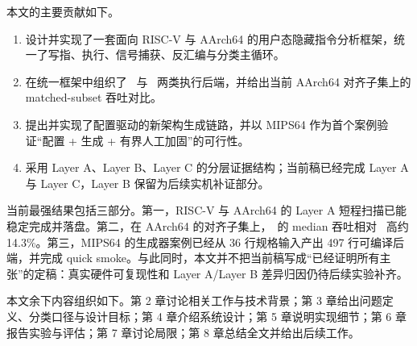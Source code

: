 本文的主要贡献如下。
\begin{enumerate}[leftmargin=2em]
  \item 设计并实现了一套面向 RISC-V 与 AArch64 的用户态隐藏指令分析框架，统一了写指、执行、信号捕获、反汇编与分类主循环。
  \item 在统一框架中组织了 \memcage\ 与 \ptracebackend\ 两类执行后端，并给出当前 AArch64 对齐子集上的 matched-subset 吞吐对比。
  \item 提出并实现了配置驱动的新架构生成链路，并以 MIPS64 作为首个案例验证“配置 + 生成 + 有界人工加固”的可行性。
  \item 采用 Layer A、Layer B、Layer C 的分层证据结构；当前稿已经完成 Layer A 与 Layer C，Layer B 保留为后续实机补证部分。
\end{enumerate}

当前最强结果包括三部分。第一，RISC-V 与 AArch64 的 Layer A 短程扫描已能稳定完成并落盘。第二，在 AArch64 的对齐子集上，\memcage\ 的 median 吞吐相对 \ptracebackend\ 高约 14.3\%。第三，MIPS64 的生成器案例已经从 36 行规格输入产出 497 行可编译后端，并完成 quick smoke。与此同时，本文并不把当前稿写成“已经证明所有主张”的定稿：真实硬件可复现性和 Layer A/Layer B 差异归因仍待后续实验补齐。

本文余下内容组织如下。第 2 章讨论相关工作与技术背景；第 3 章给出问题定义、分类口径与设计目标；第 4 章介绍系统设计；第 5 章说明实现细节；第 6 章报告实验与评估；第 7 章讨论局限；第 8 章总结全文并给出后续工作。
